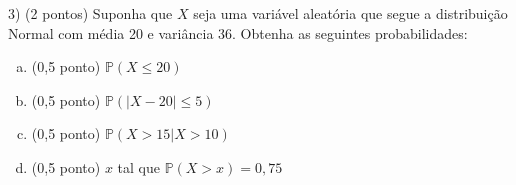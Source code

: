 \documentclass{article}
\begin{document}
\vspace{5px}

3) (2 pontos) Suponha que $X$ seja uma variável aleatória que segue a distribuição Normal com média 20 e variância 36. Obtenha as seguintes probabilidades:
\begin{enumerate}[a)]
    \item (0,5 ponto) $\mathds{P}(X \leq 20)$
    \item (0,5 ponto) $\mathds{P}(|X-20| \leq 5)$
    \item (0,5 ponto) $\mathds{P}(X > 15| X>10)$
    \item (0,5 ponto) $x$ tal que $\mathds{P}(X>x)=0,75$
\end{enumerate}
\end{document}
